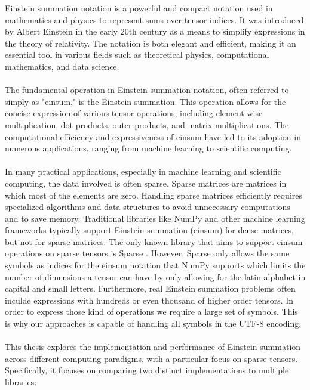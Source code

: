 Einstein summation notation is a powerful and compact notation used in mathematics
and physics to represent sums over tensor indices. It was introduced by Albert
Einstein in the early 20th century as a means to simplify expressions in the
theory of relativity. \cite{einstein1916} The notation is both elegant and efficient,
making it an essential tool in various fields such as theoretical physics, computational
mathematics, and data science.
\\\\
The fundamental operation in Einstein summation notation, often referred to simply
as "einsum," is the Einstein summation. This operation allows for the concise expression
of various tensor operations, including element-wise multiplication, dot products,
outer products, and matrix multiplications. The computational efficiency and
expressiveness of einsum have led to its adoption in numerous applications,
ranging from machine learning to scientific computing.
\\\\
In many practical applications, especially in machine learning and scientific computing,
the data involved is often sparse. Sparse matrices are matrices in which most of
the elements are zero. Handling sparse matrices efficiently requires specialized
algorithms and data structures to avoid unnecessary computations and to save memory.
Traditional libraries like NumPy \cite{numpy} and other machine learning frameworks typically %
support Einstein summation (einsum) for dense matrices, but not for sparse matrices.
The only known library that aims to support einsum operations on sparse tensors is
Sparse \cite{sparse}. However, Sparse only allows the same symbols as indices for
the einsum notation that NumPy supports which limits the number of dimensions a tensor
can have by only allowing for the latin alphabet in capital and small letters. Furthermore,
real Einstein summation problems often inculde expressions with hundreds or even
thousand of higher order tensors. In order to express those kind of operations we
require a large set of symbols. This is why our approaches is capable of handling
all symbols in the UTF-8 encoding.
\\\\
This thesis explores the implementation and performance of Einstein summation
across different computing paradigms, with a particular focus on sparse tensors.
Specifically, it focuses on comparing two distinct implementations to multiple libraries:

